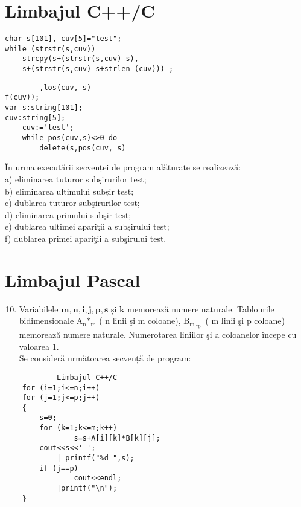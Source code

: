 \section*{Limbajul C++/C}
\begin{verbatim}
char s[101], cuv[5]="test";
while (strstr(s,cuv))
    strcpy(s+(strstr(s,cuv)-s),
    s+(strstr(s,cuv)-s+strlen (cuv))) ;
\end{verbatim}

\begin{verbatim}
        ,los(cuv, s)
f(cuv));
var s:string[101];
cuv:string[5];
    cuv:='test';
    while pos(cuv,s)<>0 do
        delete(s,pos(cuv, s)
\end{verbatim}

În urma executării secvenței de program alăturate se realizează:\\
a) eliminarea tuturor subşirurilor test;\\
b) eliminarea ultimului subșir test;\\
c) dublarea tuturor subşirurilor test;\\
d) eliminarea primului subşir test;\\
e) dublarea ultimei apariţii a subşirului test;\\
f) dublarea primei apariţii a subşirului test.

\section*{Limbajul Pascal}
\begin{enumerate}
  \setcounter{enumi}{9}
  \item Variabilele $\mathbf{m}, \mathbf{n}, \mathbf{i}, \mathbf{j}, \mathbf{p}, \mathbf{s}$ și $\mathbf{k}$ memorează numere naturale. Tablourile bidimensionale $\mathrm{A}_{\mathrm{n}} \mathrm{*}_{\mathrm{m}}$ ( n linii şi m coloane), $\mathrm{B}_{\mathrm{m} \star_{\mathrm{p}}}$ ( m linii şi p coloane) memorează numere naturale. Numerotarea liniilor şi a coloanelor începe cu valoarea 1.\\
Se consideră următoarea secvență de program:
\end{enumerate}

\begin{verbatim}
            Limbajul C++/C
    for (i=1;i<=n;i++)
    for (j=1;j<=p;j++)
    {
        s=0;
        for (k=1;k<=m;k++)
                s=s+A[i][k]*B[k][j];
        cout<<s<<' ';
            | printf("%d ",s);
        if (j==p)
                cout<<endl;
            |printf("\n");
    }
\end{verbatim}

